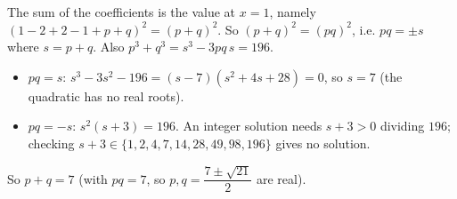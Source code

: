 The sum of the coefficients is the value at $x=1$, namely $(1-2+2-1+p+q)^2=(p+q)^2$. So $(p+q)^2=(pq)^2$, i.e. $pq=\pm s$ where $s=p+q$. Also $p^3+q^3=s^3-3pq\,s=196$.
\begin{itemize}
\item $pq=s$: $s^3-3s^2-196=(s-7)\left(s^2+4s+28\right)=0$, so $s=7$ (the quadratic has no real roots).
\item $pq=-s$: $s^2(s+3)=196$. An integer solution needs $s+3>0$ dividing $196$; checking $s+3\in\{1,2,4,7,14,28,49,98,196\}$ gives no solution.
\end{itemize}
So $p+q=\boxed{7}$ (with $pq=7$, so $p,q=\dfrac{7\pm\sqrt{21}}{2}$ are real).

